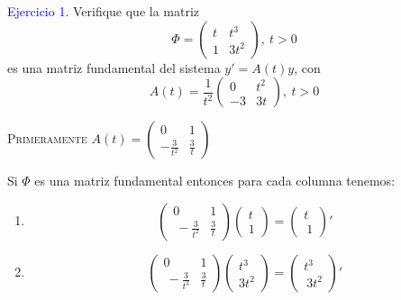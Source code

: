 \textcolor{blue}{Ejercicio 1.} Verifique que la matriz
$$\Phi=\begin{pmatrix}t&t^3\\ 1&3t^2\end{pmatrix},\:t>0$$
es una matriz fundamental del sistema $y'=A(t)y$, con 
$$A\left(t\right)=\frac{1}{t^2}\begin{pmatrix}0&t^2\\ -3&3t\end{pmatrix},\:t>0$$

    \textsc{Primeramente $A(t)=\begin{pmatrix}0&1\\ -\frac{3}{t^2}&\frac{3}{t}\end{pmatrix}$}

Si $\Phi$ es una matriz fundamental entonces para cada columna tenemos:
\begin{enumerate}
    \item  $$\begin{pmatrix}0&1\\ \:-\frac{3}{t^2}&\frac{3}{t}\end{pmatrix}\begin{pmatrix}t\\ 1\end{pmatrix}=\begin{pmatrix}t\\ \:1\end{pmatrix}'$$
    \item  $$\begin{pmatrix}0&1\\ \:-\frac{3}{t^2}&\frac{3}{t}\end{pmatrix}\begin{pmatrix}t^3\\ 3t^2\end{pmatrix}=\begin{pmatrix}t^3\\ \:3t^2\end{pmatrix}'$$
\end{enumerate}

